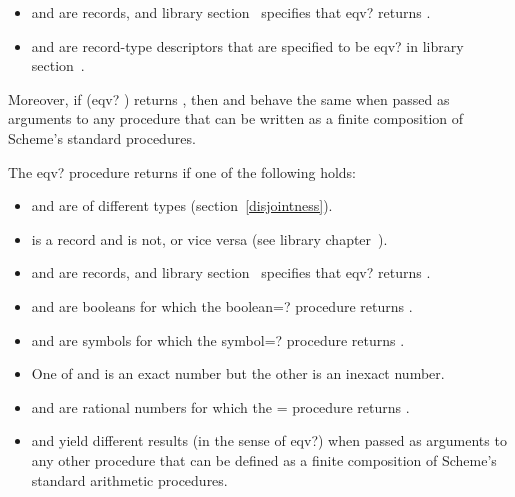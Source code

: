 \begin{entry}{%
}
\begin{itemize}
\item {} and  are records, and 
  library section~ specifies that {\cf eqv?}
  returns \schtrue.

\item {} and  are record-type descriptors that are
  specified to be {\cf eqv?} in library
  section~.
\end{itemize}

Moreover, if {\cf (eqv?  )} returns \schtrue,
then  and  behave the same when passed as
arguments to any procedure that can be written as a finite composition
of Scheme's standard procedures.

The {\cf eqv?} procedure returns \schfalse{} if one of the following holds:

\begin{itemize}
\item {} and  are of different types
(section~\ref{disjointness}).

\item {} is a record and  is not, or vice versa
  (see library chapter~).

\item {} and  are records, and 
  library section~ specifies that {\cf eqv?}
  returns \schfalse.

\item {} and  are booleans for which the {\cf
    boolean=?} procedure returns \schfalse.

\item {} and  are symbols for which the {\cf
    symbol=?} procedure returns \schfalse.

\item One of  and  is an exact number but the other is
        an inexact number.

\item {} and  are rational numbers for which the {\cf =} procedure
  returns \schfalse{}.

\item {} and  yield different results (in the sense of
  {\cf eqv?}) when passed as arguments to any other procedure
  that can be defined as a finite composition of Scheme's
  standard arithmetic procedures.


\end{itemize}
\end{entry}
